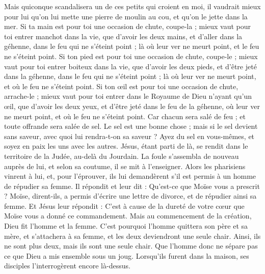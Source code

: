 \begin{multicols}{2}
Mais quiconque scandalisera un de ces petits qui croient en moi, il vaudrait mieux pour lui qu'on lui mette une pierre de moulin au cou, et qu'on le jette dans la mer.
Si ta main est pour toi une occasion de chute, coupe-la ; mieux vaut pour toi entrer manchot dans la vie, que d'avoir les deux mains, et d’aller dans la géhenne, dans le feu qui ne s'éteint point ;
là où leur ver ne meurt point, et le feu ne s'éteint point.
Si ton pied est pour toi une occasion de chute, coupe-le ; mieux vaut pour toi entrer boiteux dans la vie, que d'avoir les deux pieds, et d’être jeté dans la géhenne, dans le feu qui ne s'éteint point ;
là où leur ver ne meurt point, et où le feu ne s'éteint point.
Si ton œil est pour toi une occasion de chute, arrache-le ; mieux vaut pour toi entrer dans le Royaume de Dieu n'ayant qu'un œil, que d'avoir les deux yeux, et d’être jeté dans le feu de la géhenne,
où leur ver ne meurt point, et où le feu ne s'éteint point.
Car chacun sera salé de feu ; et toute offrande sera salée de sel.
Le sel est une bonne chose ; mais si le sel devient sans saveur, avec quoi lui rendra-t-on sa saveur ?
Ayez du sel en vous-mêmes, et soyez en paix les uns avec les autres.
\VerseOne{}Jésus, étant parti de là, se rendit dans le territoire de la Judée, au-delà du Jourdain. La foule s’assembla de nouveau auprès de lui, et selon sa coutume, il se mit à l’enseigner.
Alors les pharisiens vinrent à lui, et, pour l'éprouver, ils lui demandèrent s’il est permis à un homme de répudier sa femme.
Il répondit et leur dit : Qu'est-ce que Moïse vous a prescrit ?
Moïse, dirent-ils, a permis d'écrire une lettre de divorce, et de répudier ainsi sa femme{}.
Et Jésus leur répondit : C’est à cause de la dureté de votre cœur que Moïse vous a donné ce commandement.
Mais au commencement de la création, Dieu fit l’homme et la femme.
C'est pourquoi l'homme quittera son père et sa mère, et s'attachera à sa femme,
et les deux deviendront une seule chair. Ainsi, ils ne sont plus deux, mais ils sont une seule chair.
Que l'homme donc ne sépare pas ce que Dieu a mis ensemble sous un joug{}.
Lorsqu’ils furent dans la maison, ses disciples l'interrogèrent encore là-dessus.

\end{multicols}
